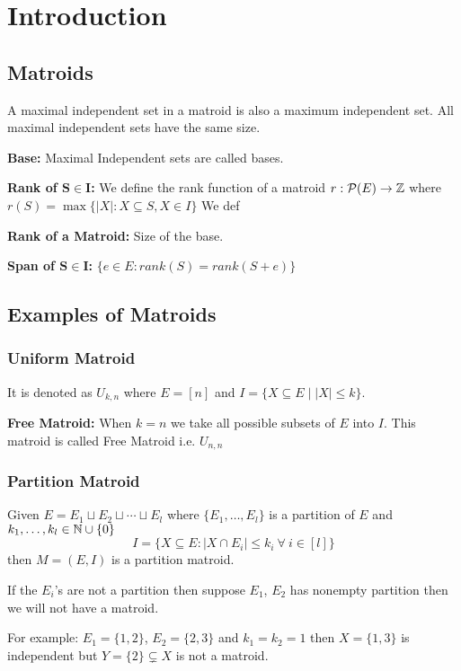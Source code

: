 \chapter{Introduction}
\section{Matroids}
\begin{observation*}
	A maximal independent set in a matroid is also a maximum independent set. All maximal independent sets have the same size.
\end{observation*}
\parinf

\textbf{Base:} Maximal Independent sets are called bases.

\textbf{Rank of $\boldsymbol{S\in I}$:} We define the rank function of a matroid $r:\mathcal{P}(E)\to \mathbb{Z}$ where $r(S)=\max\{|X|\colon X\subseteq S, X\in I\}$ We def

\textbf{Rank of a Matroid:} Size of the base.

\textbf{Span of $\boldsymbol{S\in I}$:} $\{e\in E\colon rank(S)=rank(S+e)\}$

\section{Examples of Matroids}
\subsection{{Uniform Matroid} }It is {denoted as $U_{k,n}$ where $E=[n]$ and $I=\{X\subseteq E\mid |X|\leq k\}$.}


\textbf{Free Matroid: }When $k=n$ we take all possible subsets of $E$ into $I$. This matroid is called {Free Matroid} i.e. $U_{n,n}$\parinn

\subsection{Partition Matroid} Given $E=E_1\sqcup E_2\sqcup \cdots \sqcup E_l$ where $\{E_1,\dots, E_l\}$ is a partition of $E$ and $k_1,\dots,k_l\in \mathbb{N}\cup \{0\}$ $$I=\{X\subseteq E\colon |X\cap E_i|\leq k_i\ \forall \ i\in[l]\}$$then $M=(E,I)$ is a partition matroid.
\begin{note}
	If the $E_i$'s are not a partition then suppose $E_1$, $E_2$ has nonempty partition then we will not have a matroid. 
	
	For example: $E_1=\{1,2\}$, $E_2=\{2,3\}$ and $k_1=k_2=1$ then $X=\{1,3\}$ is independent but $Y=\{2\}\subsetneq X$ is not a matroid. 
\end{note}

